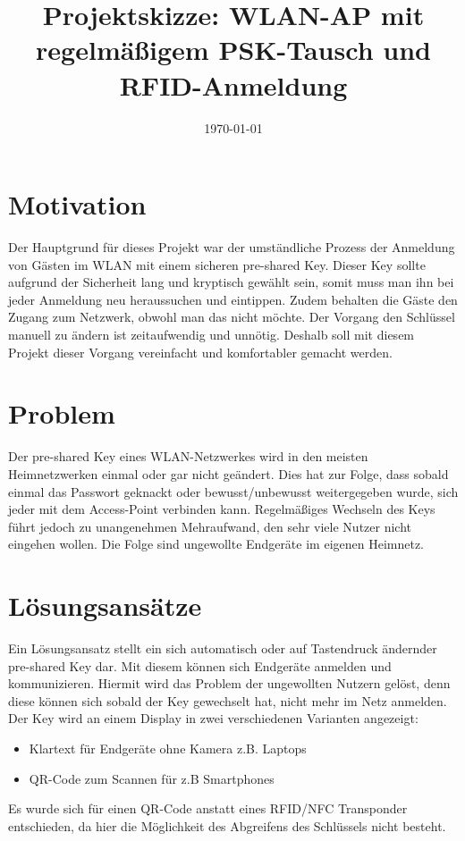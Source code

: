 \documentclass[a4paper,11pt,singlespacing]{article}
\title{Projektskizze: WLAN-AP mit regelmäßigem PSK-Tausch und RFID-Anmeldung}
\date{\today}
\begin{document}
	\setlength{\parindent}{0ex}
	
	\maketitle
	
	\section{Motivation}
	Der Hauptgrund für dieses Projekt war der umständliche Prozess der Anmeldung von Gästen im WLAN mit einem sicheren pre-shared Key. Dieser Key sollte aufgrund der Sicherheit lang und kryptisch gewählt sein, somit muss man ihn bei jeder Anmeldung neu heraussuchen und eintippen. Zudem behalten die Gäste den Zugang zum Netzwerk, obwohl man das nicht möchte. Der Vorgang den Schlüssel manuell zu ändern ist zeitaufwendig und unnötig. Deshalb soll mit diesem Projekt dieser Vorgang vereinfacht und komfortabler gemacht werden. 
	
	\section{Problem}
	Der pre-shared Key eines WLAN-Netzwerkes wird in den meisten Heimnetzwerken einmal oder gar nicht geändert. Dies hat zur Folge, dass sobald einmal das Passwort geknackt oder bewusst/unbewusst weitergegeben wurde, sich jeder mit dem Access-Point verbinden kann. Regelmäßiges Wechseln des Keys führt jedoch zu unangenehmen Mehraufwand, den sehr viele Nutzer nicht eingehen wollen. Die Folge sind ungewollte Endgeräte im eigenen Heimnetz.

	\section{Lösungsansätze}
	Ein Lösungsansatz stellt ein sich automatisch oder auf Tastendruck ändernder pre-shared Key dar. Mit diesem können sich Endgeräte anmelden und kommunizieren. Hiermit wird das Problem der ungewollten Nutzern gelöst, denn diese können sich sobald der Key gewechselt hat, nicht mehr im Netz anmelden. Der Key wird an einem Display in zwei verschiedenen Varianten angezeigt:
	\begin{itemize}
		\item Klartext für Endgeräte ohne Kamera z.B. Laptops
		\item QR-Code zum Scannen für z.B Smartphones
	\end{itemize}
	Es wurde sich für einen QR-Code anstatt eines RFID/NFC Transponder entschieden, da hier die Möglichkeit des Abgreifens des Schlüssels nicht besteht. 
\end{document}

